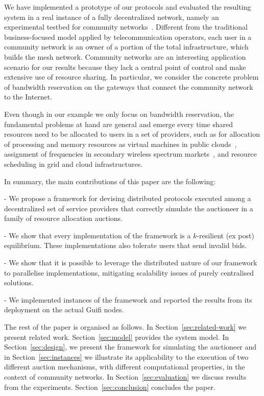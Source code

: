 We have implemented a prototype of our protocols and evaluated the
resulting system in a real instance of a fully decentralized network,
namely an experimental testbed for community networks~\cite{Braem2013}.  
Different from the traditional
business-focused model applied by telecommunication operators, each
user in a community network is an owner of a portion of the total
infrastructure, which builds the mesh network.
Community networks are an interesting application scenario for
our results  because they lack a central point of control and make
extensive use of resource sharing. In particular, we consider the
concrete problem of bandwidth reservation on the gateways that connect
the community network to the Internet.  

Even though in our example we only focus on bandwidth
reservation, the fundamental problems at hand are general and emerge
every time shared resources need to be allocated to users in a set of
providers, such as for allocation of processing and memory resources
as virtual machines in public clouds~\cite{Zhang2015Truthful},
assignment of frequencies in secondary wireless spectrum
markets~\cite{Zhou2008}, and resource scheduling in grid and cloud
infrastructures\cite{Lai2004}.


In summary, the main contributions of this paper are the following:

\vspace{0.3mm}
- We propose a framework for devising distributed protocols executed
among a decentralized set of service providers that correctly simulate the
auctioneer in a family of resource allocation auctions.

\vspace{0.3mm}
- We show that every implementation of the framework is a $k$-resilient (ex post) equilibrium.
These implementations also tolerate users that send invalid bids.

\vspace{0.3mm}
- We show that it is possible to leverage the distributed nature of our framework to parallelise implementations,
mitigating scalability issues of purely centralised solutions.

\vspace{0.3mm}
- We implemented instances of the framework and reported the results from its deployment on the actual Guifi nodes.

\vspace{0.3mm} 

The rest of the paper is organised as follows.  In
Section~\ref{sec:related-work} we present related work.
Section~\ref{sec:model} provides the system model.  In
Section~\ref{sec:design}, we present the framework for simulating the
auctioneer and in Section~\ref{sec:instances} we illustrate its
applicability to the execution of two different auction mechanisms,
with different computational properties, in the context of community networks.  In
Section~\ref{sec:evaluation} we discuss results from the experiments.
Section~\ref{sec:conclusion} concludes the paper.
